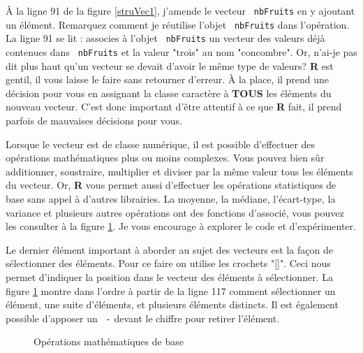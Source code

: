 \documentclass[10.5pt,a4paper]{article}
\newcommand{\rcode}[1]{\texttt{\color{rstudio} #1}}
\begin{document}
    À la ligne 91 de la figure \ref{struVec1}, j'amende le vecteur \rcode{nbFruits} en y ajoutant un élément. Remarquez comment je réutilise l'objet \rcode{nbFruits} dans l'opération. La ligne 91 se lit : associes à l'objet \rcode{nbFruits} un vecteur des valeurs déjà contenues dans \rcode{nbFruits} et la valeur "trois" au nom "concombre". Or, n'ai-je pas dit plus haut qu'un vecteur se devait d'avoir le même type de valeurs? \textbf{R} est gentil, il vous laisse le faire sans retourner d'erreur. À la place, il prend une décision pour vous en assignant la classe caractère à \textbf{TOUS} les éléments du nouveau vecteur. C'est donc important d'être attentif à ce que \textbf{R} fait, il prend parfois de mauvaises décisions pour vous. 
    
    Lorsque le vecteur est de classe numérique, il est possible d'effectuer des opérations mathématiques plus ou moins complexes. Vous pouvez bien sûr additionner, soustraire, multiplier et diviser par la même valeur tous les éléments du vecteur. Or, \textbf{R} vous permet aussi d'effectuer les opérations statistiques de base sans appel à d'autres librairies. La moyenne, la médiane, l'écart-type, la variance et plusieurs autres opérations ont des fonctions d'associé, vous pouvez les consulter à la figure \ref{struVec2}. Je vous encourage à explorer le code et d'expérimenter. 
    
    Le dernier élément important à aborder au sujet des vecteurs est la façon de sélectionner des éléments. Pour ce faire on utilise les crochets "[]". Ceci nous permet d'indiquer la position dans le vecteur des éléments à sélectionner. La figure \ref{struVec2} montre dans l'ordre à partir de la ligne 117 comment sélectionner un élément, une suite d'éléments, et plusieurs éléments distincts. Il est également possible d'apposer un \rcode{-} devant le chiffre pour retirer l'élément. 
    
    \begin{figure}[H]
    \centering
    \caption{Opérations mathématiques de base}
    \label{struVec2}
    \end{figure}
    
\end{document}
